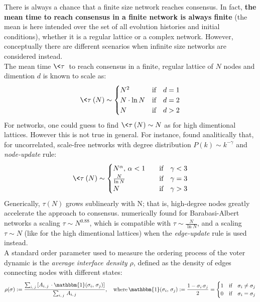 There is always a chance that a finite size network reaches consensus. In fact, \textbf{the mean time to reach consensus in a finite network is always finite} (the mean is here intended over the set of all evolution histories and initial conditions), whether it is a regular lattice or a complex network. However, conceptually there are different scenarios when infinite size networks are considered instead.\\
The mean time $\<\tau\>$ to reach consensus in a finite, regular lattice of $N$ nodes and dimention $d$ is known to scale as:
\begin{equation*}
    \<\tau\>(N) \sim
    \begin{cases}
        N^2 \quad &\text{if}\quad d=1 \\
        N\cdot \ln{N} &\text{if}\quad d=2 \\
        N &\text{if}\quad d>2 \\
    \end{cases}
\end{equation*}
For networks, one could guess to find $\<\tau\>(N) \sim N$ as for high dimentional lattices. However this is not true in general. For instance, \cite{sood} found analitically that, for uncorrelated, scale-free networks with degree distribution $P(k)\sim k^{-\gamma}$ and \textit{node-update} rule:
\begin{equation*}
    \<\tau\>(N) \sim
        \begin{cases}
         N^{\alpha}, \, \alpha<1 \quad &\text{if}\quad \gamma < 3 \\
        \frac{N}{\ln{N}} &\text{if}\quad \gamma = 3 \\
         N &\text{if}\quad \gamma > 3 \\
    \end{cases}
\end{equation*}
Generically, $\tau(N)$ grows sublinearly with N; that is, high-degree nodes greatly accelerate the approach to consensus. \cite{suchecki_numerical} numerically found for Barabasi-Albert networks a scaling $\tau \sim N^{0.88}$, which is compatible with $\tau \sim \frac{N}{\ln{N}}$, and a scaling $\tau \sim N$ (like for the high dimentional lattices) when the \textit{edge-update} rule is used instead. \\
A standard order parameter used to measure the ordering process of the voter dynamic is the \textit{average interface density $\rho$}, defined as the density of edges connecting nodes with different states:
\begin{equation}
    \rho(\mathbf{\sigma}) := \frac{\sum_{i,\,j}\left[A_{i,\,j}\,\cdot \mathbbm{1}(\sigma_i,\,\sigma_j)\right]}{\sum_{i,\,j}\, A_{i,\,j}}, \quad \text{where} \, \mathbbm{1}(\sigma_i,\,\sigma_j):= \frac{1 - \sigma_i\,\sigma_j}{2} = 
    \begin{cases}
        1 & \text{if}\quad \sigma_i\neq \sigma_j \\
        0 & \text{if}\quad \sigma_i= \sigma_j \\
    \end{cases}
\end{equation}
